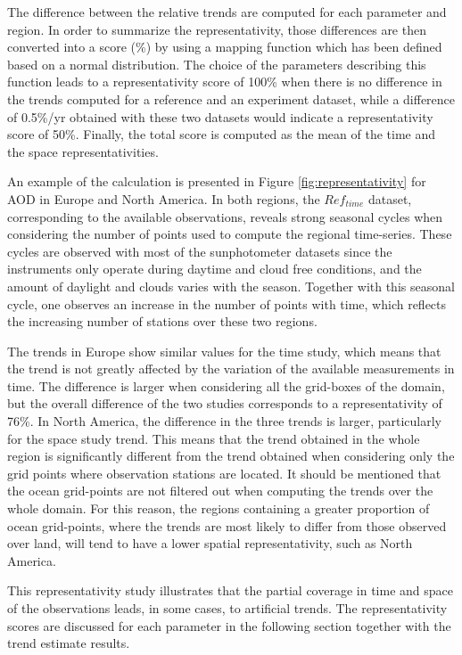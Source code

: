 \documentclass[acp, manuscript]{copernicus}
\begin{document}
The difference between the relative trends are computed for each parameter and region. In order to summarize the representativity, those differences are then converted into a score (\unit{\%}) by using a mapping function which has been defined based on a normal distribution. The choice of the parameters describing this function leads to a representativity score of 100\% when there is no difference in the trends computed for a reference and an experiment dataset, while a difference of 0.5\unit{\%/yr} obtained with these two datasets would indicate a representativity score of 50\%. Finally, the total score is computed as the mean of the time and the space representativities.

An example of the calculation is presented in Figure \ref{fig:representativity} for AOD in Europe and North America. In both regions, the $Ref_{time}$ dataset, corresponding to the available observations, reveals strong seasonal cycles when considering the number of points used to compute the regional time-series. These cycles are observed with most of the sunphotometer datasets since the instruments only operate during daytime and cloud free conditions, and the amount of daylight and clouds varies with the season. Together with this seasonal cycle, one observes an increase in the number of points with time, which reflects the increasing number of stations over these two regions.

The trends in Europe show similar values for the time study, which means that the trend is not greatly affected by the variation of the available measurements in time. The difference is larger when considering all the grid-boxes of the domain, but the overall difference of the two studies corresponds to a representativity of 76\%. In North America, the difference in the three trends is larger, particularly for the space study trend. This means that the trend obtained in the whole region is significantly different from the trend obtained when considering only the grid points where observation stations are located. It should be mentioned that the ocean grid-points are not filtered out when computing the trends over the whole domain. For this reason, the regions containing a greater proportion of ocean grid-points, where the trends are most likely to differ from those observed over land, will tend to have a lower spatial representativity, such as North America.

This representativity study illustrates that the partial coverage in time and space of the observations leads, in some cases, to artificial trends. The representativity scores are discussed for each parameter in the following section together with the trend estimate results.
\end{document}
